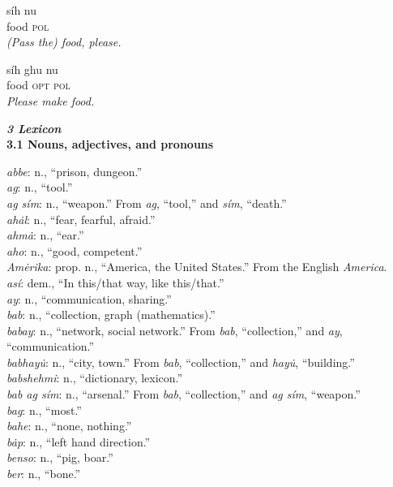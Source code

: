 \documentclass{article}[10pt]
\begin{document}
\begin{exe}
\ex
\gll s\'{i}h nu\\
food \textsc{pol}\\
\trans \emph{(Pass the) food, please.}

\ex
\gll s\'{i}h ghu nu\\
food \textsc{opt} \textsc{pol}\\
\trans \emph{Please make food.}
\end{exe}

\clearpage
{\bf \emph{3 Lexicon}}\\

{\bf 3.1 Nouns, adjectives, and pronouns}
\begin{multicols}{3}
\noindent
\emph{abbe}: n., ``prison, dungeon.''\\
\emph{ag}: n., ``tool.''\\
\emph{ag s\'{i}m}: n., ``weapon.'' From \emph{ag}, ``tool,'' and \emph{s\'{i}m}, ``death.''\\
\emph{ah\.{a}l}: n., ``fear, fearful, afraid.''\\
\emph{ahm\.{a}}: n., ``ear.''\\
\emph{aho}: n., ``good, competent.''\\
\emph{Am\.{e}rika}: prop. n., ``America, the United States.'' From the English \emph{America}.\\
\emph{as\'{i}}: dem., ``In this/that way, like this/that.''\\
\emph{ay}: n., ``communication, sharing.''\\
\emph{bab}: n., ``collection, graph (mathematics).''\\
\emph{babay}: n., ``network, social network.'' From \emph{bab}, ``collection,'' and \emph{ay}, ``communication.''\\
\emph{babhay\.{u}}: n., ``city, town.'' From \emph{bab}, ``collection,'' and \emph{hay\.{u}}, ``building.''\\
\emph{babshehmi}: n., ``dictionary, lexicon.''\\
\emph{bab ag s\'{i}m}: n., ``arsenal.'' From \emph{bab}, ``collection,'' and \emph{ag s\'{i}m}, ``weapon.''\\
\emph{bag}: n., ``most.''\\
\emph{bahe}: n., ``none, nothing.''\\
\emph{b\.{a}p}: n., ``left hand direction.''\\
\emph{benso}: n., ``pig, boar.''\\
\emph{ber}: n., ``bone.''\\

\end{multicols}
\end{document}
